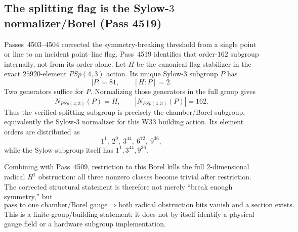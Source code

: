 \subsection{The splitting flag is the Sylow-$3$ normalizer/Borel (Pass 4519)}
\label{sec:pass4519-flag-borel}

Passes~4503--4504 corrected the symmetry-breaking threshold from a single
point or line to an incident point--line flag.  Pass~4519 identifies that
order-$162$ subgroup internally, not from its order alone.  Let $H$ be the
canonical flag stabilizer in the exact $25920$-element $PSp(4,3)$ action.  Its
unique Sylow-$3$ subgroup $P$ has
\[
 |P|=81,\qquad [H:P]=2.
\]
Two generators suffice for $P$.  Normalizing those generators in the full group
gives
\[
 \boxed{N_{PSp(4,3)}(P)=H,\qquad |N_{PSp(4,3)}(P)|=162.}
\]
Thus the verified splitting subgroup is precisely the chamber/Borel subgroup,
equivalently the Sylow-$3$ normalizer for this W33 building action.  Its element
orders are distributed as
\[
 1^1,\ 2^9,\ 3^{44},\ 6^{72},\ 9^{36},
\]
while the Sylow subgroup itself has $1^1,3^{44},9^{36}$.

Combining with Pass~4509, restriction to this Borel kills the full
$2$-dimensional radical $H^1$ obstruction: all three nonzero classes become
trivial after restriction.  The corrected structural statement is therefore
not merely ``break enough symmetry,'' but
\[
 \boxed{\text{pass to one chamber/Borel gauge}\Longrightarrow
        \text{both radical obstruction bits vanish and a section exists}.}
\]
This is a finite-group/building statement; it does not by itself identify a
physical gauge field or a hardware subgroup implementation.


